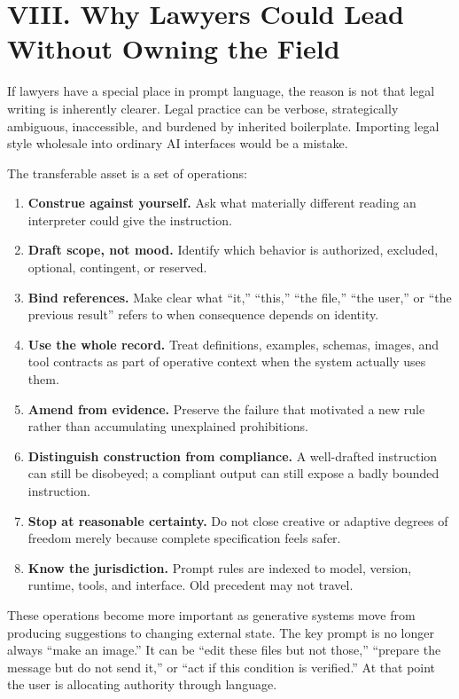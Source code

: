 \documentclass[11pt]{article}
\begin{document}
\section*{VIII. Why Lawyers Could Lead Without Owning the Field}
If lawyers have a special place in prompt language, the reason is not that legal writing is inherently clearer. Legal practice can be verbose, strategically ambiguous, inaccessible, and burdened by inherited boilerplate. Importing legal style wholesale into ordinary AI interfaces would be a mistake.

The transferable asset is a set of operations:

\begin{enumerate}[leftmargin=1.7em]
\item \textbf{Construe against yourself.} Ask what materially different reading an interpreter could give the instruction.
\item \textbf{Draft scope, not mood.} Identify which behavior is authorized, excluded, optional, contingent, or reserved.
\item \textbf{Bind references.} Make clear what ``it,'' ``this,'' ``the file,'' ``the user,'' or ``the previous result'' refers to when consequence depends on identity.
\item \textbf{Use the whole record.} Treat definitions, examples, schemas, images, and tool contracts as part of operative context when the system actually uses them.
\item \textbf{Amend from evidence.} Preserve the failure that motivated a new rule rather than accumulating unexplained prohibitions.
\item \textbf{Distinguish construction from compliance.} A well-drafted instruction can still be disobeyed; a compliant output can still expose a badly bounded instruction.
\item \textbf{Stop at reasonable certainty.} Do not close creative or adaptive degrees of freedom merely because complete specification feels safer.
\item \textbf{Know the jurisdiction.} Prompt rules are indexed to model, version, runtime, tools, and interface. Old precedent may not travel.
\end{enumerate}

These operations become more important as generative systems move from producing suggestions to changing external state. The key prompt is no longer always ``make an image.'' It can be ``edit these files but not those,'' ``prepare the message but do not send it,'' or ``act if this condition is verified.'' At that point the user is allocating authority through language.
\end{document}
